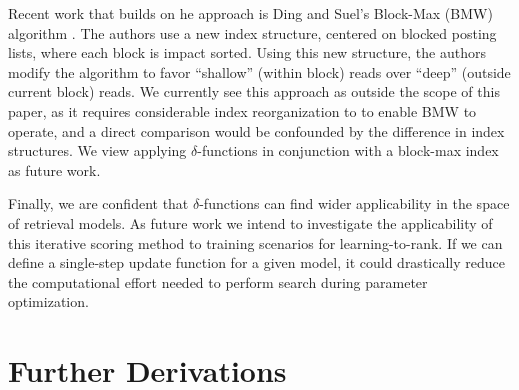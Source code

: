 \documentclass{sig-alternate}
\newcommand{\method}[1]{{\sc{#1}}}
\begin{document}
Recent work that builds on he \method{wand} approach is Ding and Suel's Block-Max \method{wand} (BMW) algorithm \cite{ding-sigir-2011}. The authors use a new index structure, centered on blocked posting lists, where each block is impact sorted. Using this new structure, the authors modify the \method{wand} algorithm to favor ``shallow'' (within block) reads over ``deep'' (outside current block) reads. We currently see this approach as outside the scope of this paper, as it requires considerable index reorganization to to enable BMW to operate, and a direct comparison would be confounded by the difference in index structures. We view applying $\delta$-functions in conjunction with a block-max index as future work.

Finally, we are confident that $\delta$-functions can find wider applicability in the space of retrieval models. As future work we intend to investigate the applicability of this iterative scoring method to training scenarios for learning-to-rank. If we can define a single-step update function for a given model, it could drastically reduce the computational effort needed to perform search during parameter optimization. 

\small


\appendix
\section{Further Derivations} \label{app:derivations}
\end{document}
